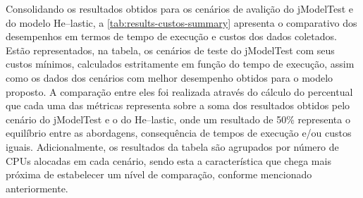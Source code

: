 \documentclass[english,brazilian]{UNISINOSmonografia} %
\begin{document}
Consolidando os resultados obtidos para os cenários de avalição do jModelTest e do modelo \textsf{He}--lastic, a \autoref{tab:results-custos-summary} apresenta o comparativo dos desempenhos em termos de tempo de execução e custos dos dados coletados.
%
Estão representados, na tabela, os cenários de teste do jModelTest com seus custos mínimos, calculados estritamente em função do tempo de execução, assim como os dados dos cenários com melhor desempenho obtidos para o modelo proposto.
%
A comparação entre eles foi realizada através do cálculo do percentual que cada uma das métricas representa sobre a soma dos resultados obtidos pelo cenário do jModelTest e o do \textsf{He}--lastic, onde um resultado de 50\% representa o equilíbrio entre as abordagens, consequência de tempos de execução e/ou custos iguais.
%
Adicionalmente, os resultados da tabela são agrupados por número de CPUs alocadas em cada cenário, sendo esta a característica que chega mais próxima de estabelecer um nível de comparação, conforme mencionado anteriormente.
\end{document}
